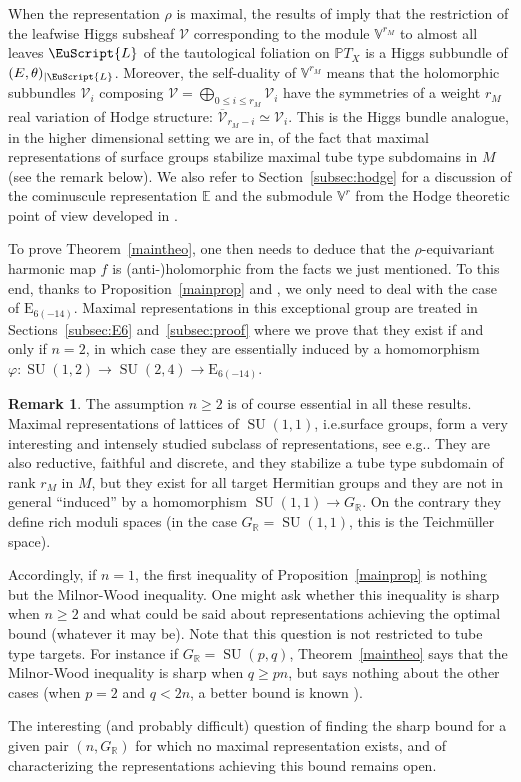 \documentclass[10pt]{amsart}
\let\mathcal\mathscr
\let\cites\cite
\newcommand{\Leaf}{\EuScript{L}}
\theoremstyle{plain}
\theoremstyle{definition}
\newtheorem*{rema*}{Remark}
\let\ov\overline
\let\rgy r
\DeclareMathOperator{\SU}{SU}
\newcommand{\cV}{\mathcal{V}}
\newcommand{\bE}{\mathbb{E}}
\newcommand{\bV}{\mathbb{V}}
\newcommand{\bR}{\mathbb{R}}
\newcommand{\PTX}{{\mathbb{P}T_X}}
\newcommand{\Vr}{\mathbb{V}^\rgy}
\newcommand{\rkm}{{r_M}}
\providecommand{\eg}{e.g.}\providecommand{\ie}{i.e.}\providecommand{\etc}{etc.}\providecommand{\resp}{resp.}\providecommand{\cf}{cf.}
\begin{document}
When the representation $\rho$ is maximal, the results of \cite{KM} imply that the restric\-tion of the
leafwise Higgs subsheaf $\cV$ corresponding to the module $\bV^\rkm$
to almost all leaves $\Leaf$ of the tautological foliation on $\PTX$ is a Higgs subbundle of
$(E,\theta)_{|\Leaf}$. Moreover, the self-duality of $\bV^\rkm$ means that the
holomorphic subbundles $\cV_i$ composing $\cV=\bigoplus_{0\leq i\leq\rkm}\cV_i$ have the
symmetries of a weight $\rkm$ real variation of Hodge structure: $\ov{\cV}_{\rkm-i}\simeq\cV_i$.
This is the Higgs bundle analogue, in the higher dimensional setting we are in, of the fact that
maximal representations of surface groups stabilize maximal tube type subdomains in $M$ (see the
remark below). We also refer to Section~\ref{subsec:hodge} for a discussion of the cominuscule
representation $\bE$ and the submodule $\Vr$ from the Hodge theoretic point of view developed in \cites{Gross, ShengZuo}.

To prove Theorem~\ref{maintheo}, one then needs to deduce that the $\rho$-equivariant
harmonic map $f$ is (anti-)holomorphic from the facts we just mentioned. To this end, thanks to
Proposition~\ref{mainprop} and \cite{KM}, we only need to
deal with the case of $\mathrm{E}_{6 (-14)}$.
Maximal representations in this exceptional group are treated
in Sections~\ref{subsec:E6} and~\ref{subsec:proof} where we prove that they exist if and
only if $n=2$, in which case they are
essentially induced by a homomorphism $ \varphi: \SU(1,2)\to\SU(2,4)\to \mathrm{E}_{6 (-14)}$.

\begin{rema*}\label{ngeq2}
The assumption $n\geq 2$ is of course essential in all these results. Maximal representations of
lattices of $\SU(1,1)$, \ie surface groups, form a very interesting
and intensely studied subclass
of representations, see \eg \cites{Hernandez,Xia00,MarkmanXia, BGPG1, BGPG2,
BIW10,GuichardWienhard}. They are also reductive, faithful and discrete, and they
stabilize a tube type subdomain of rank $\rkm$ in $M$, but
they exist for all target Hermitian groups and they are not in
general ``induced'' by a homomorphism $\SU(1,1)\to G_\bR$. On the contrary they define rich moduli
spaces (in the case $G_\bR=\SU(1,1)$, this is the Teichmüller space).

Accordingly, if $n=1$, the first inequality of Proposition~\ref{mainprop} is nothing but the
Milnor-Wood inequality.
One might ask whether this inequality is sharp when $n\geq 2$ and what could be said about representations
achieving the optimal bound (whatever it may be). Note that this question is not restricted to tube
type targets. For instance if $G_\bR=\SU(p,q)$, Theorem~\ref{maintheo} says that the Milnor-Wood
inequality is sharp when $q \geq pn$, but says nothing about the
other cases (when $p=2$
and $q<2n$, a better bound is known \cite{KMrank2}).

The interesting (and probably difficult) question of finding the sharp bound for a given pair
$(n,G_\bR)$
for which no maximal representation exists, and of characterizing the
representations achieving this bound remains open.
\end{rema*}
\end{document}
